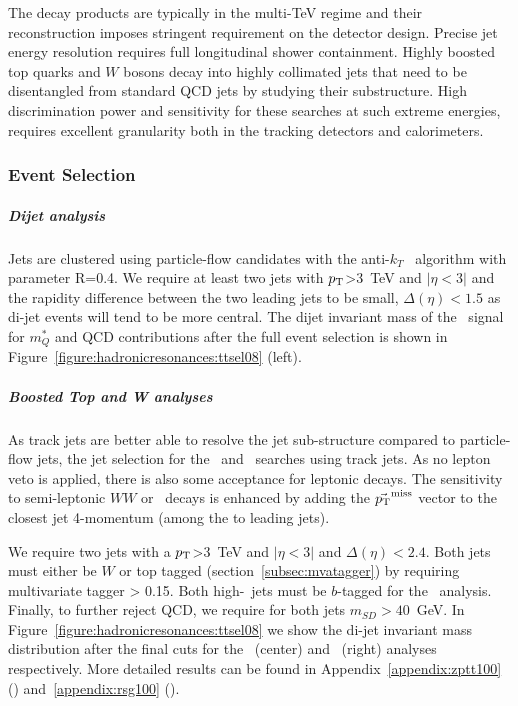 The decay products are typically in the multi-TeV regime and their reconstruction imposes stringent requirement on the detector design. Precise jet energy resolution requires full longitudinal shower containment. Highly boosted top quarks and $W$ bosons decay into highly collimated jets that need to  be disentangled from standard QCD jets by studying their substructure. High discrimination power and sensitivity for these searches at such extreme energies, requires excellent granularity both in the tracking detectors and calorimeters.

\subsubsection{Event Selection}

\subparagraph{Dijet analysis}

Jets are clustered using particle-flow candidates with the anti-$k_T$~\cite{Cacciari:2008gp} algorithm with parameter R=0.4. We require at least two jets with $p_{\text{T}}$>3~TeV and $|\eta<3|$ and the rapidity difference between the two leading jets to be small, $\Delta(\eta)<1.5$ as di-jet events will tend to be more central. The dijet invariant mass of the \qjj\ signal for $m_Q^{*}$ and QCD contributions after the full event selection is shown in Figure~\ref{figure:hadronicresonances:ttsel08} (left).

\subparagraph{Boosted Top and W analyses}

As track jets are better able to resolve the jet sub-structure compared to particle-flow jets, the jet selection for the \rsg\ and \zptt\ searches using track jets. As no lepton veto is applied, there is also some acceptance for leptonic decays. The sensitivity to semi-leptonic $WW$ or \ttbar\ decays is enhanced by adding the $\vec{p_{\text{T}}}^{\textrm{miss}}$ vector to the closest jet 4-momentum (among the to leading jets).

We require two jets with a $p_{\text{T}}$>3~TeV and $|\eta<3|$ and $\Delta(\eta)<2.4$. Both jets must either be $W$ or top tagged (section~\ref{subsec:mvatagger}) by requiring multivariate tagger > 0.15. Both high-\pt\ jets must be $b$-tagged for the \zptt\ analysis. Finally, to further reject QCD, we require for both jets $m_{SD}>40$~GeV. In Figure~\ref{figure:hadronicresonances:ttsel08} we show the di-jet invariant mass distribution after the final cuts for the \rsg\ (center) and \zptt\ (right) analyses respectively.
\newline
More detailed results can be found in Appendix~\ref{appendix:zptt100} (\zptt) and~\ref{appendix:rsg100} (\rsg).

